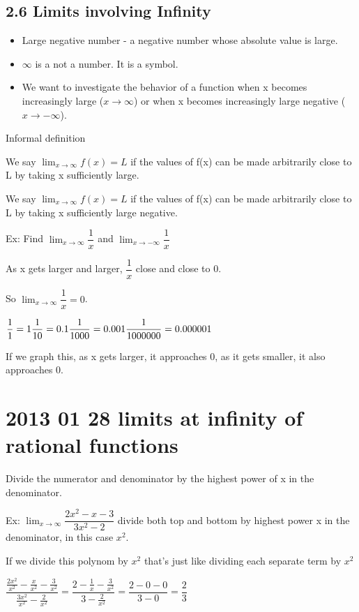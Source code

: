 \documentclass[12pt]{article}
\begin{document}
\subsection{2.6 Limits involving Infinity}
\begin{itemize}
\item Large negative number - a negative number whose absolute value is large.
\item $\infty$ is a not a number. It is a symbol.
\item We want to investigate the behavior of a function when x becomes increasingly large ($x \to \infty$) or when
  x becomes increasingly large negative ($x \to -\infty$).
\end{itemize}

Informal definition

We say $\lim_{x\to\infty} f(x) = L$ if the values of f(x) can be made arbitrarily close to L by taking x
sufficiently large.

We say $\lim_{x\to\infty}f(x)=L$ if the values of f(x) can be made arbitrarily close to L by taking x
sufficiently large negative.

Ex: Find $\lim_{x\to\infty}\dfrac{1}{x}$ and $\lim_{x\to -\infty}\dfrac{1}{x}$

As x gets larger and larger, $\dfrac{1}{x}$ close and close to 0.

So $\lim_{x\to\infty}\dfrac{1}{x}=0$.

$
\dfrac{1}{1} = 1\\
\dfrac{1}{10}= 0.1\\
\dfrac{1}{1000}=0.001\\
\dfrac{1}{1000000}=0.000001
$

If we graph this, as x gets larger, it approaches 0, as it gets smaller, it also approaches 0.

\section{2013 01 28 limits at infinity of rational functions}

Divide the numerator and denominator by the highest power of x in the denominator.

Ex: $\lim_{x \to \infty}\dfrac{2x^2-x-3}{3x^2-2}$
divide both top and bottom by highest power x in the denominator, in this case $x^2$.

If we divide this polynom by $x^2$ that's just like dividing each separate term by $x^2$

$\dfrac{\frac{2x^2}{x^2}- \frac{x}{x^2} -\frac{3}{x^2}}{\frac{3x^2}{x^2} - \frac{2}{x^2}} = \dfrac{2-\frac{1}{x}-\frac{3}{x^2}}{3-\frac{2}{x^2}} = \dfrac{2-0-0}{3-0} = \dfrac{2}{3}$
\end{document}
